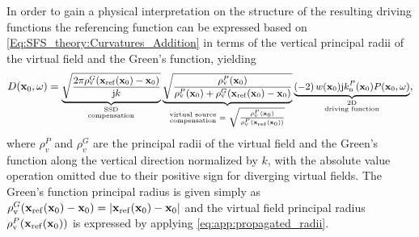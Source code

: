 In order to gain a physical interpretation on the structure of the resulting driving functions the referencing function can be expressed based on \eqref{Eq:SFS_theory:Curvatures_Addition} in terms of the vertical principal radii of the virtual field and the Green's function, yielding
\begin{equation}
\small
\label{Eq:SFS_theory:25D_WFS_driv_fun_ver_2}
D(\mathbf{x}_0, \omega) = 
\underbrace{\sqrt{\frac{2\pi \rho_\mathrm{v}^G(\mathbf{x}_{\mathrm{ref}}(\mathbf{x}_0)-\mathbf{x}_0) }{\mathrm{j} k}}}_{{\substack{\text{SSD}\\\text{compensation}}}}
\underbrace{\sqrt{ \frac{\rho_\mathrm{v}^P(\mathbf{x}_0) }{\rho_\mathrm{v}^P(\mathbf{x}_0) +  \rho_\mathrm{v}^G(\mathbf{x}_{\mathrm{ref}}(\mathbf{x}_0)-\mathbf{x}_0) } }}_{{\substack{\text{virtual source}\\\text{compensation}}} 
 \hspace{1mm} = \hspace{1mm}\sqrt{\frac{\rho_\mathrm{v}^P(\mathbf{x}_0)}{\rho_\mathrm{v}^P(\mathbf{x}_{\mathrm{ref}}(\mathbf{x}_0))}}
}
\underbrace{\left(-2\right) w(\mathbf{x}_0)  \mathrm{j} k_{\mathrm{n}}^P(\mathbf{x}_0) 	P(\mathbf{x}_0,\omega)}_{\substack{\text{2D}\\\text{driving function}}},
\end{equation}
where $\rho_v^P$ and $\rho_v^G$ are the principal radii of the virtual field and the Green's function along the vertical direction normalized by $k$, with the absolute value operation omitted due to their positive sign for diverging virtual fields.
The Green's function principal radius is given simply as $\rho_\mathrm{v}^G(\mathbf{x}_{\mathrm{ref}}(\mathbf{x}_0)-\mathbf{x}_0) = |\mathbf{x}_{\mathrm{ref}}(\mathbf{x}_0)-\mathbf{x}_0|$ and the virtual field principal radius $\rho_\mathrm{v}^P(\mathbf{x}_{\mathrm{ref}}(\mathbf{x}_0))$ is expressed by applying \eqref{eq:app:propagated_radii}.

